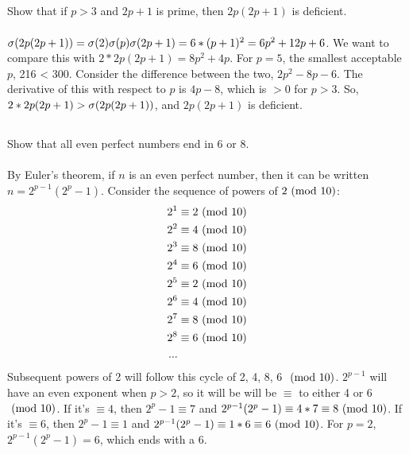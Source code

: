\documentclass{article}
\begin{document}
\subsection{}
Show that if $p > 3$ and $2p + 1$ is prime, then $2p(2p + 1)$ is deficient.\\~\\
$\sigma(2p(2p + 1)) = \sigma(2)\sigma(p)\sigma(2p + 1) = 6 * (p + 1)^2 = 6p^2 + 12p + 6$.
We want to compare this with $2 * 2p(2p + 1) = 8p^2 + 4p$.
For $p = 5$, the smallest acceptable $p$, 216 < 300.
Consider the difference between the two, $2p^2 - 8p - 6$.
The derivative of this with respect to $p$ is $4p - 8$, which is $> 0$ for $p > 3$.
So, $2 * 2p(2p + 1) > \sigma(2p(2p + 1))$, and $2p(2p + 1)$ is deficient.

\subsection{}
Show that all even perfect numbers end in 6 or 8.\\~\\
By Euler's theorem, if $n$ is an even perfect number, then it
can be written $n = 2^{p - 1}(2^p - 1)$.
Consider the sequence of powers of $2 \ (\mathrm{mod}\ 10)$:
\begin{align*}
    2^1 &\equiv 2 \ (\mathrm{mod}\ 10)\\
    2^2 &\equiv 4 \ (\mathrm{mod}\ 10)\\
    2^3 &\equiv 8 \ (\mathrm{mod}\ 10)\\
    2^4 &\equiv 6 \ (\mathrm{mod}\ 10)\\
    2^5 &\equiv 2 \ (\mathrm{mod}\ 10)\\
    2^6 &\equiv 4 \ (\mathrm{mod}\ 10)\\
    2^7 &\equiv 8 \ (\mathrm{mod}\ 10)\\
    2^8 &\equiv 6 \ (\mathrm{mod}\ 10)\\
    ...
\end{align*}
Subsequent powers of 2 will follow this cycle of 2, 4, 8, 6 $\ (\mathrm{mod}\ 10)$.
$2^{p - 1}$ will have an even exponent when $p > 2$,
so it will be will be $\equiv$ to either 4 or 6 $\ (\mathrm{mod}\ 10)$.
If it's $\equiv 4$, then $2^p - 1 \equiv 7$ and
$2^{p - 1}(2^p - 1) \equiv 4 * 7 \equiv 8 \ (\mathrm{mod}\ 10)$.
If it's $\equiv 6$, then $2^p - 1 \equiv 1$ and
$2^{p - 1}(2^p - 1) \equiv 1 * 6 \equiv 6 \ (\mathrm{mod}\ 10)$.
For $p = 2$, $2^{p - 1}(2^p - 1) = 6$, which ends with a 6.

\end{document}
